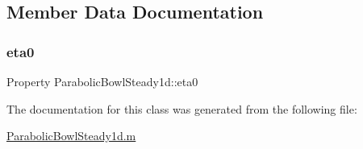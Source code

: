 \subsection{Member Data Documentation}
\mbox{\label{class_parabolic_bowl_steady1d_a15df6e8b776c6dc5b3e9426be69890ee}} 
\subsubsection{\texorpdfstring{eta0}{eta0}}
{\footnotesize\ttfamily Property Parabolic\+Bowl\+Steady1d\+::eta0}



The documentation for this class was generated from the following file\+:\begin{DoxyCompactItemize}
\item 
\hyperlink{_parabolic_bowl_steady1d_8m}{Parabolic\+Bowl\+Steady1d.\+m}\end{DoxyCompactItemize}
